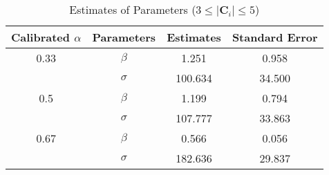 \begin{table}[H]
\centering
\caption{Estimates of Parameters ($3 \leq |\mathbf{C}_i| \leq 5$)}
\label{table: estimates (min_size=3 max_size=5 margin=1000)}
\begin{tabular}{cccc}
\toprule
Calibrated $\alpha$ & Parameters & Estimates & Standard Error \\
\midrule
0.33 & $\beta$ & 1.251 & 0.958 \\
 & $\sigma$ & 100.634 & 34.500 \\
0.5 & $\beta$ & 1.199 & 0.794 \\
 & $\sigma$ & 107.777 & 33.863 \\
0.67 & $\beta$ & 0.566 & 0.056 \\
 & $\sigma$ & 182.636 & 29.837 \\
\bottomrule
\end{tabular}
\end{table}
